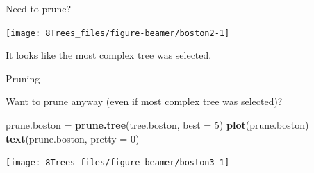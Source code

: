 \documentclass[10pt,ignorenonframetext,]{beamer}
\newenvironment{Shaded}{\begin{snugshade}}{\end{snugshade}}
\newcommand{\KeywordTok}[1]{\textcolor[rgb]{0.13,0.29,0.53}{\textbf{#1}}}
\newcommand{\DataTypeTok}[1]{\textcolor[rgb]{0.13,0.29,0.53}{#1}}
\newcommand{\DecValTok}[1]{\textcolor[rgb]{0.00,0.00,0.81}{#1}}
\newcommand{\StringTok}[1]{\textcolor[rgb]{0.31,0.60,0.02}{#1}}
\newcommand{\OperatorTok}[1]{\textcolor[rgb]{0.81,0.36,0.00}{\textbf{#1}}}
\newcommand{\NormalTok}[1]{#1}
\begin{document}
\begin{frame}[fragile]

\begin{block}{Need to prune?}

\scriptsize

\begin{Shaded}
\end{Shaded}

\begin{center}\texttt{[image: 8Trees\_files/figure-beamer/boston2-1]} \end{center}

\normalsize

It looks like the most complex tree was selected.

\end{block}

\end{frame}

\begin{frame}[fragile]

\begin{block}{Pruning}

\vspace{1mm}

Want to prune anyway (even if most complex tree was selected)?

\scriptsize

\begin{Shaded}
\begin{Highlighting}[]
\NormalTok{prune.boston =}\StringTok{ }\KeywordTok{prune.tree}\NormalTok{(tree.boston, }\DataTypeTok{best =} \DecValTok{5}\NormalTok{)}
\KeywordTok{plot}\NormalTok{(prune.boston)}
\KeywordTok{text}\NormalTok{(prune.boston, }\DataTypeTok{pretty =} \DecValTok{0}\NormalTok{)}
\end{Highlighting}
\end{Shaded}

\begin{center}\texttt{[image: 8Trees\_files/figure-beamer/boston3-1]} \end{center}

\end{block}

\end{frame}
\end{document}
